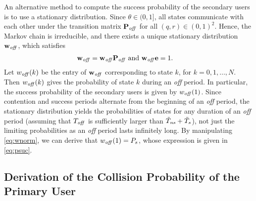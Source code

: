 \documentclass[12pt,draftclsnofoot,onecolumn]{IEEEtran}
\begin{document}
An alternative method to compute the success probability of the secondary users
is to use a stationary distribution. Since $\theta \in (0,1]$, all states
communicate with each other under the transition matrix $\mathbf{P}_{\textrm{\emph{off}}}$
for all $(q,r) \in (0,1)^2$.
Hence, the Markov chain is irreducible, and there exists
a unique stationary distribution $\mathbf{w}_{\textrm{\emph{off}}}$,
which satisfies
\begin{align} \label{eq:wnorm}
\mathbf{w}_{\textrm{\emph{off}}} = \mathbf{w}_{\textrm{\emph{off}}} \mathbf{P}_{\textrm{\emph{off}}}& \textrm{ and }
\mathbf{w}_{\textrm{\emph{off}}} \mathbf{e} = 1.
\end{align}
Let ${w}_{\textrm{\emph{off}}}(k)$ be the entry of $\mathbf{w}_{\textrm{\emph{off}}}$
corresponding to state $k$, for $k = 0,1,\ldots,N$.
Then ${w}_{\textrm{\emph{off}}}(k)$ gives the probability of state $k$ during an \emph{off} period.
In particular, the success probability of the secondary users
is given by ${w}_{\textrm{\emph{off}}}(1)$.
Since contention and success periods alternate from the beginning
of an \emph{off} period, the stationary distribution yields the probabilities of states
for any duration of an \emph{off} period (assuming that $T_{\textrm{\emph{off}}}$ is sufficiently larger than
$\tilde{T}_{\textrm{\emph{ns}}} + \tilde{T}_s$), not just the limiting probabilities as an \emph{off} period
lasts infinitely long. By manipulating \eqref{eq:wnorm}, we can derive that
${w}_{\textrm{\emph{off}}}(1) = P_s$, whose expression is given in \eqref{eq:psuc}.

\subsection{Derivation of the Collision Probability of the Primary User}
\end{document}
